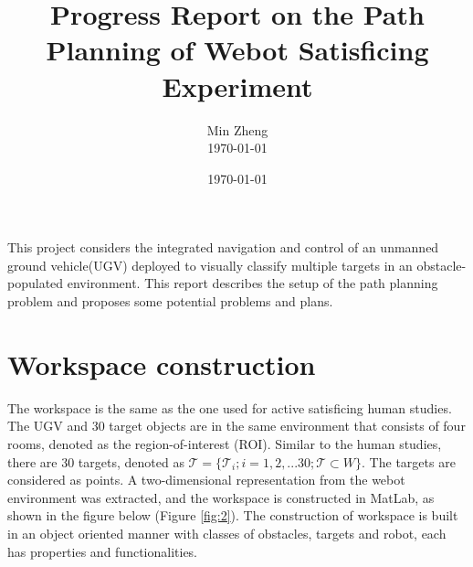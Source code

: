\documentclass[12pt,draftcls,onecolumn]{IEEEtran}
\begin{document}
\title{Progress Report on the Path Planning of Webot Satisficing Experiment }


\author{  Min Zheng \\  \today}

\date{\today}

\maketitle




This project considers the integrated navigation and control of an unmanned ground vehicle(UGV) deployed to visually classify multiple targets in an obstacle-populated environment. 
This report describes the setup of the path planning problem and proposes some potential problems and plans. 

\section{Workspace construction} 

The workspace is the same as the one used for active satisficing human studies. 
The UGV and 30 target objects are in the same environment that consists of four rooms, denoted as the region-of-interest (ROI).
Similar to the human studies, there are 30 targets, denoted as $\mathcal{T} = \{\mathcal{T}_i; i = 1,2,...30; \mathcal{T} \subset W \}$.
The targets are considered as points.
A two-dimensional representation from the webot environment was extracted, and the workspace is constructed in MatLab, as shown in the figure below  (Figure \ref{fig:2}). 
The construction of workspace is built in an object oriented manner with classes of obstacles, targets and robot, each has properties and functionalities.  
\end{document}
